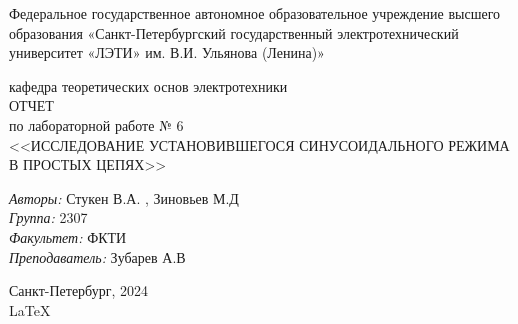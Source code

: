 \documentclass[a4paper,12pt]{report}
\begin{document}
 

\begin{titlepage} 

\begin{center} 

\large Федеральное государственное автономное образовательное учреждение высшего образования «Санкт-Петербургский государственный электротехнический университет «ЛЭТИ» им. В.И. Ульянова (Ленина)»

кафедра теоретических основ электротехники\\[5cm] 

\huge ОТЧЕТ\\ по лабораторной работе № 6\\[0.5cm] 
\large <<ИССЛЕДОВАНИЕ УСТАНОВИВШЕГОСЯ СИНУСОИДАЛЬНОГО РЕЖИМА В ПРОСТЫХ ЦЕПЯХ>>\\[3.7cm]

\begin{minipage}{1\textwidth} 
    \begin{flushleft} 
        \emph{Авторы:} Стукен В.А. , Зиновьев М.Д\\
        \emph{Группа:} 2307\\
        \emph{Факультет:} ФКТИ\\
        \emph{Преподаватель:} Зубарев А.В
    \end{flushleft} 
\end{minipage} 

\vfill 

Санкт-Петербург, 2024\\
{\large \LaTeX} 

\end{center} 

\thispagestyle{empty} 
\end{titlepage} 
\end{document}
